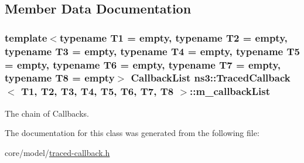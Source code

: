 \subsection{Member Data Documentation}
\subsubsection[{\texorpdfstring{m\+\_\+callback\+List}{m_callbackList}}]{\setlength{\rightskip}{0pt plus 5cm}template$<$typename T1 = empty, typename T2 = empty, typename T3 = empty, typename T4 = empty, typename T5 = empty, typename T6 = empty, typename T7 = empty, typename T8 = empty$>$ {\bf Callback\+List} {\bf ns3\+::\+Traced\+Callback}$<$ T1, T2, T3, T4, T5, T6, T7, T8 $>$\+::m\+\_\+callback\+List\hspace{0.3cm}{\ttfamily [private]}}\hypertarget{classns3_1_1TracedCallback_a62a6b339936be6550a2321334bb24220}{}\label{classns3_1_1TracedCallback_a62a6b339936be6550a2321334bb24220}
The chain of Callbacks. 

The documentation for this class was generated from the following file\+:\begin{DoxyCompactItemize}
\item 
core/model/\hyperlink{traced-callback_8h}{traced-\/callback.\+h}\end{DoxyCompactItemize}
